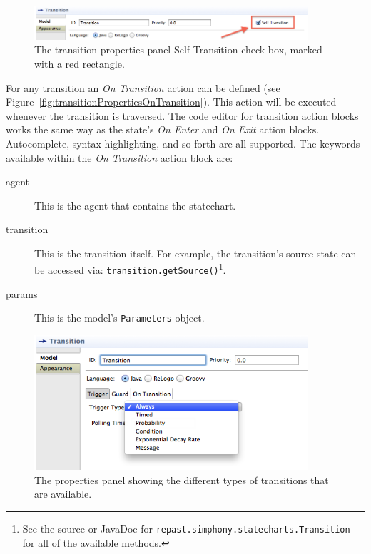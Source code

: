 \documentclass[11pt]{amsart}
\begin{document}
\begin{figure}
\begin{center}
\vspace{.2in}
\centerline {
\includegraphics[width=4in]{StatechartsImages/SelfTransitionBox.png}
}
\caption{The transition properties panel Self Transition check box, marked with a red rectangle.}
\label{fig:selfTransitionBox}
\end{center}
\end{figure}

For any transition an \emph{On Transition} action can be defined (see Figure~\ref{fig:transitionPropertiesOnTransition}). This action will be executed whenever the transition is traversed. The code editor for transition action blocks works the same way as the state's  \emph{On Enter} and \emph{On Exit} action blocks. Autocomplete, syntax highlighting, and so forth are all supported. The keywords available within the \emph{On Transition} action block are:
\begin{description}
\item[agent] This is the agent that contains the statechart.
\item[transition] This is the transition itself. For example, the transition's source state can be accessed via: \texttt{transition.getSource()}\footnote{See the source or JavaDoc for \texttt{repast.simphony.statecharts.Transition} for all of the available methods.}.
\item[params] This is the model's \texttt{Parameters} object.
\end{description}

\begin{figure}
\begin{center}
\vspace{.2in}
\centerline {
\includegraphics[width=4in]{StatechartsImages/TransitionProperties.png}
}
\caption{The properties panel showing the different types of transitions that are available.}
\label{fig:transitionProperties}
\end{center}
\end{figure}
\end{document}
